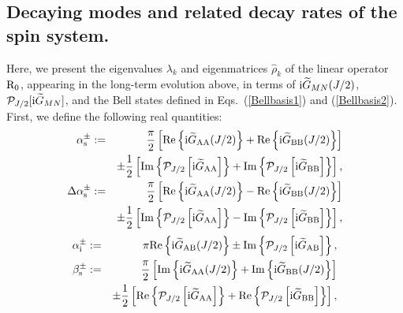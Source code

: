\documentclass[]{nature}
\begin{document}
{\subsection{Decaying modes and related decay rates of the spin system.
}
\label{app:eig}



Here, we present the eigenvalues $\lambda_k$ and eigenmatrices $\hat\rho_k$ of the linear operator
${\rm R}_0$, appearing in the long-term evolution above, in terms of  ${\rm i}\widetilde{G}_{MN}(J/2)$, ${\cal P}_{J/2}[{\rm i}\widetilde{G}_{MN}]$, and  the Bell states
defined in Eqs.~(\ref{Bellbasis1}) and (\ref{Bellbasis2}). First, we define the following real quantities:
\begin{eqnarray}
\alpha^\pm_{\rm s}&:=&\frac{\pi}{2}\left[{\rm Re}\left\{{\rm i}\widetilde{G}_{\rm AA}(J/2) \right\}+
{\rm Re}\left\{{\rm i}\widetilde{G}_{\rm BB}(J/2) \right\}\right]\nonumber \\
& &\pm \frac{1}{2}\left[{\rm Im}\left\{{\cal P}_{J/2}\left[{\rm i}\widetilde{G}_{\rm AA}\right]\right\}+
{\rm Im}\left\{{\cal P}_{J/2}\left[{\rm i}\widetilde{G}_{\rm BB}\right]\right\}\right],
\label{alphas}\\
\Delta\alpha^\pm_{\rm s}&:=&\frac{\pi}{2}\left[{\rm Re}\left\{{\rm i}\widetilde{G}_{\rm AA}(J/2) \right\}-
{\rm Re}\left\{{\rm i}\widetilde{G}_{\rm BB}(J/2) \right\}\right]\nonumber \\
& &\pm \frac{1}{2}\left[{\rm Im}\left\{{\cal P}_{J/2}\left[{\rm i}\widetilde{G}_{\rm AA}\right]\right\}-
{\rm Im}\left\{{\cal P}_{J/2}\left[{\rm i}\widetilde{G}_{\rm BB}\right]\right\}\right],
\label{dalphas}
\end{eqnarray}
\begin{eqnarray}
\alpha^\pm_{\rm i}&:=&\pi{\rm Re}\left\{{\rm i}\widetilde{G}_{\rm AB}(J/2) \right\}
\pm{\rm Im}\left\{{\cal P}_{J/2}\left[{\rm i}\widetilde{G}_{\rm AB}\right]\right\},
\label{alphai}
\\
\beta^\pm_{\rm s}&:=&\frac{\pi}{2}\left[{\rm Im}\left\{{\rm i}\widetilde{G}_{\rm AA}(J/2) \right\}+
{\rm Im}\left\{{\rm i}\widetilde{G}_{\rm BB}(J/2) \right\}\right]\nonumber \\
& &\pm \frac{1}{2}\left[{\rm Re}\left\{{\cal P}_{J/2}\left[{\rm i}\widetilde{G}_{\rm AA}\right]\right\}+
{\rm Re}\left\{{\cal P}_{J/2}\left[{\rm i}\widetilde{G}_{\rm BB}\right]\right\}\right],
\label{betas}\\

\end{eqnarray}}
\end{document}
